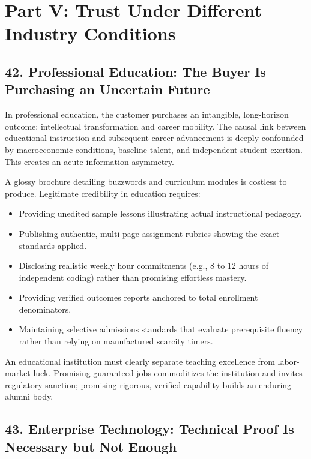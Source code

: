 \section*{Part V: Trust Under Different Industry Conditions}

\subsection*{42. Professional Education: The Buyer Is Purchasing an Uncertain Future}

In professional education, the customer purchases an intangible, long-horizon outcome: intellectual transformation and career mobility. The causal link between educational instruction and subsequent career advancement is deeply confounded by macroeconomic conditions, baseline talent, and independent student exertion. This creates an acute information asymmetry.

A glossy brochure detailing buzzwords and curriculum modules is costless to produce. Legitimate credibility in education requires:
\begin{itemize}
\item Providing unedited sample lessons illustrating actual instructional pedagogy.
\item Publishing authentic, multi-page assignment rubrics showing the exact standards applied.
\item Disclosing realistic weekly hour commitments (e.g., 8 to 12 hours of independent coding) rather than promising effortless mastery.
\item Providing verified outcomes reports anchored to total enrollment denominators.
\item Maintaining selective admissions standards that evaluate prerequisite fluency rather than relying on manufactured scarcity timers.
\end{itemize}

An educational institution must clearly separate teaching excellence from labor-market luck. Promising guaranteed jobs commoditizes the institution and invites regulatory sanction; promising rigorous, verified capability builds an enduring alumni body.

\subsection*{43. Enterprise Technology: Technical Proof Is Necessary but Not Enough}

